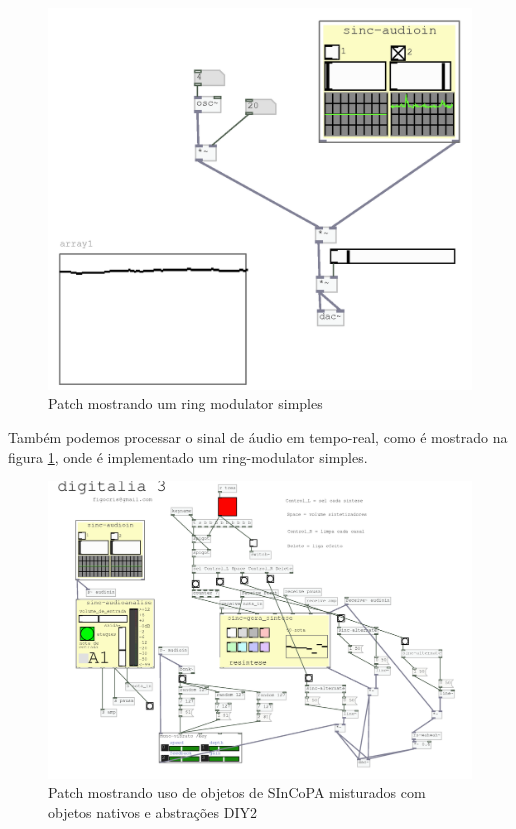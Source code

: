 \documentclass{ppgmus}
\begin{document}
\begin{figure}
\includegraphics[scale=.7]{sinc-ring}
\caption{Patch mostrando um ring modulator simples}
\label{sinc-ring}
\end{figure}


Também podemos processar o sinal de áudio em tempo-real, como é mostrado na 
figura \ref{sinc-ring}, onde é implementado um ring-modulator simples.


\begin{figure}
\includegraphics[scale=.55]{digitalia3}
\caption{Patch mostrando uso de objetos de SInCoPA misturados com objetos nativos e abstrações DIY2}
\label{digitalia3}
\end{figure}
\end{document}
